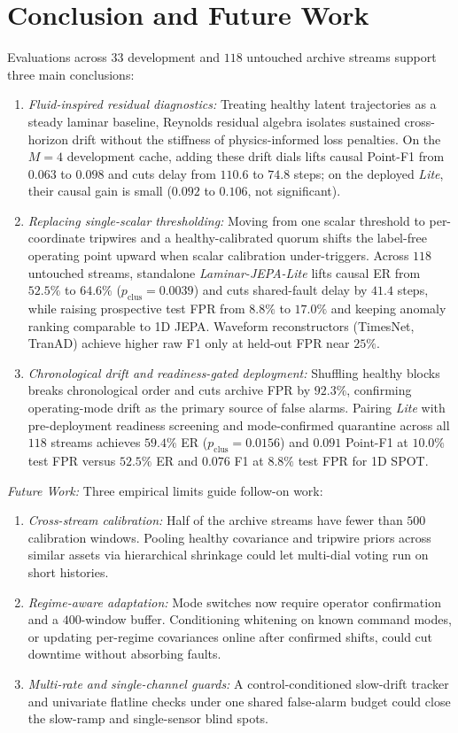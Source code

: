 \vspace{-4pt}
\section{Conclusion and Future Work}
\label{sec:conclusion}
Evaluations across $33$ development and $118$ untouched archive streams support three main conclusions:
\begin{enumerate}[leftmargin=*, nosep, itemsep=1pt]
    \item \emph{Fluid-inspired residual diagnostics:} Treating healthy latent trajectories as a steady laminar baseline, Reynolds residual algebra isolates sustained cross-horizon drift without the stiffness of physics-informed loss penalties. On the $M{=}4$ development cache, adding these drift dials lifts causal Point-F1 from $0.063$ to $0.098$ and cuts delay from $110.6$ to $74.8$ steps; on the deployed \emph{Lite}, their causal gain is small ($0.092$ to $0.106$, not significant).
    \item \emph{Replacing single-scalar thresholding:} Moving from one scalar threshold to per-coordinate tripwires and a healthy-calibrated quorum shifts the label-free operating point upward when scalar calibration under-triggers. Across $118$ untouched streams, standalone \emph{Laminar-JEPA-Lite} lifts causal ER from $52.5\%$ to $64.6\%$ ($p_{\text{clus}}=0.0039$) and cuts shared-fault delay by $41.4$ steps, while raising prospective test FPR from $8.8\%$ to $17.0\%$ and keeping anomaly ranking comparable to 1D JEPA. Waveform reconstructors (TimesNet, TranAD) achieve higher raw F1 only at held-out FPR near $25\%$.
    \item \emph{Chronological drift and readiness-gated deployment:} Shuffling healthy blocks breaks chronological order and cuts archive FPR by $92.3\%$, confirming operating-mode drift as the primary source of false alarms. Pairing \emph{Lite} with pre-deployment readiness screening and mode-confirmed quarantine across all $118$ streams achieves $59.4\%$ ER ($p_{\text{clus}}=0.0156$) and $0.091$ Point-F1 at $10.0\%$ test FPR versus $52.5\%$ ER and $0.076$ F1 at $8.8\%$ test FPR for 1D SPOT.
\end{enumerate}

\noindent\emph{Future Work:} Three empirical limits guide follow-on work:
\begin{enumerate}[leftmargin=*, nosep, itemsep=1pt]
    \item \emph{Cross-stream calibration:} Half of the archive streams have fewer than $500$ calibration windows. Pooling healthy covariance and tripwire priors across similar assets via hierarchical shrinkage could let multi-dial voting run on short histories.
    \item \emph{Regime-aware adaptation:} Mode switches now require operator confirmation and a $400$-window buffer. Conditioning whitening on known command modes, or updating per-regime covariances online after confirmed shifts, could cut downtime without absorbing faults.
    \item \emph{Multi-rate and single-channel guards:} A control-conditioned slow-drift tracker and univariate flatline checks under one shared false-alarm budget could close the slow-ramp and single-sensor blind spots.
\end{enumerate}
